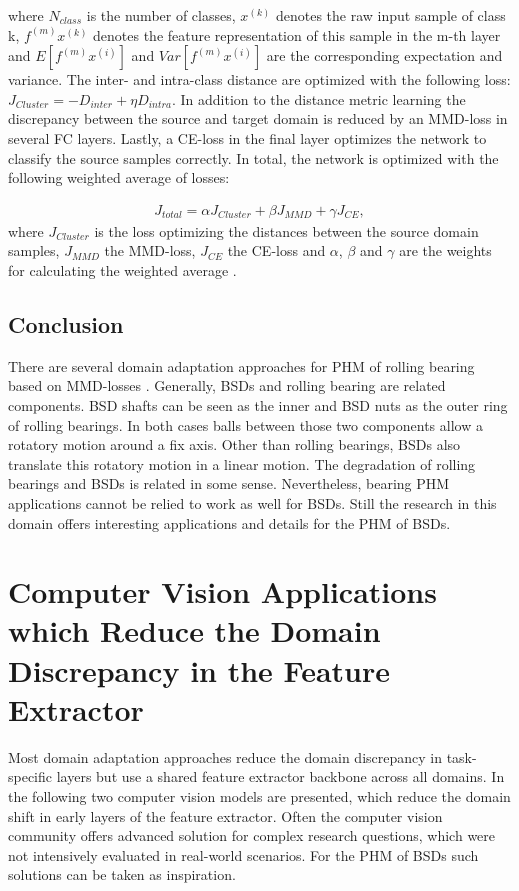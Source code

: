 where $N_{class}$ is the number of classes, $x^{(k)}$ denotes the raw input sample of class k, $f^{(m)}x^{(k)}$ denotes the feature representation of this sample in the m-th layer and $E[f^{(m)}x^{(i)}]$ and $Var[f^{(m)}x^{(i)}]$ are the corresponding expectation and variance. The inter- and intra-class distance are optimized with the following loss: $J_{Cluster} = - D_{inter} + \eta D_{intra}$. In addition to the distance metric learning the discrepancy between the source and target domain is reduced by an MMD-loss in several FC layers. Lastly, a CE-loss in the final layer optimizes the network to classify the source samples correctly. In total, the network is optimized with the following weighted average of losses: 

\begin{equation}
    \begin{aligned}
    J_{total} = \alpha J_{Cluster} + \beta J_{MMD} + \gamma J_{CE}, 
    \end{aligned}
\end{equation}
where $J_{Cluster}$ is the loss optimizing the distances between the source domain samples, $J_{MMD}$ the MMD-loss,  $J_{CE}$ the CE-loss and $\alpha$, $\beta$ and $\gamma$ are the weights for calculating the weighted average \cite{Li2018}.

\subsection{Conclusion}
There are several domain adaptation approaches for PHM of rolling bearing based on MMD-losses \cite{AN201942} \cite{Li2018} \cite{Guo2019} \cite{Singh2019} \cite{Kang2020}. Generally, BSDs and rolling bearing are related components. BSD shafts can be seen as the inner and BSD nuts as the outer ring of rolling bearings. In both cases balls between those two components allow a rotatory motion around a fix axis. Other than rolling bearings, BSDs also translate this rotatory motion in a linear motion. The degradation of rolling bearings and BSDs is related in some sense. Nevertheless, bearing PHM applications cannot be relied to work as well for BSDs. Still the research in this domain offers interesting applications and details for the PHM of BSDs. 




\section{Computer Vision Applications which Reduce the Domain Discrepancy in the Feature Extractor}
Most domain adaptation approaches reduce the domain discrepancy in task-specific layers but use a shared feature extractor backbone across all domains. In the following two computer vision models are presented, which reduce the domain shift in early layers of the feature extractor. Often the computer vision community offers advanced solution for complex research questions, which were not intensively evaluated in real-world scenarios. For the PHM of BSDs such solutions can be taken as inspiration.

